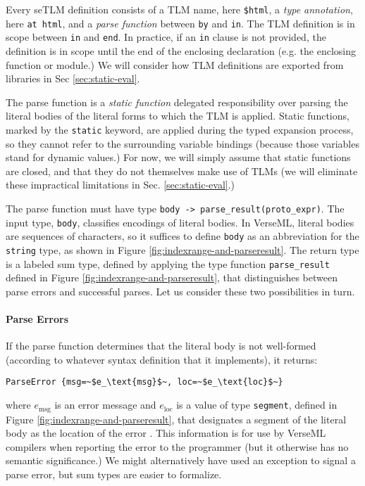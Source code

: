 \documentclass[acmsmall,10pt,review,anonymous]{acmart}\settopmatter{printfolios=true}
\newcommand{\li}[1]{\lstinline{#1}}
\begin{document}
Every seTLM definition consists of a TLM name, here \li{$html}, a \emph{type annotation}, here \lstinline{at html}, and a \emph{parse function} between \li{by} and \li{in}. The TLM definition is in scope between \li{in} and \li{end}. In practice, if an \li{in} clause is not provided, the definition is in scope until the end of the enclosing declaration (e.g. the enclosing function or module.) We will consider how TLM definitions are exported from libraries in Sec \ref{sec:static-eval}.


The {parse function} is a \emph{static function} delegated responsibility over parsing the literal bodies of the literal forms to which the TLM is applied. Static functions, marked by the \li{static} keyword, are applied during the typed expansion process, so they cannot refer to the surrounding variable bindings (because those variables stand for dynamic values.) For now, we will simply assume that static functions are closed, and that they do not themselves make use of TLMs (we will eliminate these impractical limitations in Sec. \ref{sec:static-eval}.)

The parse function must have type \li{body -> parse_result(proto_expr)}. The input type, \lstinline{body}, classifies encodings of literal {bodies}. In VerseML, literal bodies are sequences of characters, so it suffices to define \li{body} as an abbreviation for the \li{string} type, as shown in Figure \ref{fig:indexrange-and-parseresult}. The return type is a labeled sum type, defined by applying the type function \li{parse_result} defined in Figure \ref{fig:indexrange-and-parseresult}, that distinguishes between parse errors and successful parses.
Let us consider these two possibilities in turn.

\paragraph{Parse Errors} If the parse function determines that the literal body is not well-formed (according to whatever syntax definition that it implements), it returns:
\begin{lstlisting}[numbers=none]
  ParseError {msg=~$e_\text{msg}$~, loc=~$e_\text{loc}$~}
\end{lstlisting}
where $e_\text{msg}$ is an error message and $e_\text{loc}$ is a value of type \li{segment}, defined in Figure \ref{fig:indexrange-and-parseresult}, that designates a segment of the literal body as the location of the error \cite{DBLP:journals/jsc/DeursenKT93}. This information is for use by VerseML compilers when reporting the error to the programmer (but it otherwise has no semantic significance.) We might alternatively have used an exception to signal a parse error, but sum types are easier to formalize.
\end{document}
